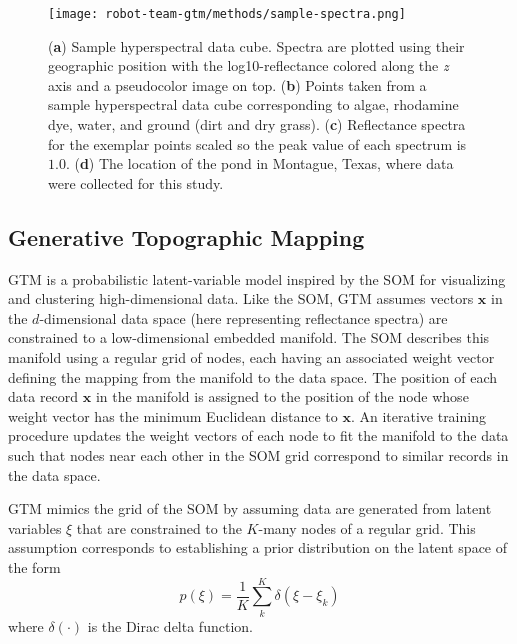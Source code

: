 \begin{figure}[H]
  \centering
  \texttt{[image: robot-team-gtm/methods/sample-spectra.png]}
  \caption{(\textbf{a}) Sample hyperspectral data cube. Spectra are plotted
    using their geographic position with the log10-reflectance colored along the
    \emph{z} axis and a pseudocolor image on top. (\textbf{b}) Points taken from
    a sample hyperspectral data cube corresponding to algae, rhodamine dye,
    water, and ground (dirt and dry grass). (\textbf{c}) Reflectance spectra for
    the exemplar points scaled so the peak value of each spectrum is $1.0$.
    (\textbf{d}) The location of the pond in Montague, Texas, where data were
    collected for this study.}
    \label{fig:sample-spectra}
\end{figure}

\subsection{Generative Topographic Mapping}\label{sec:gtm-overview}

GTM is a probabilistic latent-variable model inspired by the  SOM for visualizing and clustering high-dimensional data. Like the  SOM, GTM assumes vectors $\mathbf{x}$ in the $d$-dimensional data space (here representing reflectance spectra) are constrained to a low-dimensional embedded manifold. The SOM describes this manifold using a regular grid of nodes, each having an associated weight vector defining the mapping from the manifold to the data space. The position of each data record $\mathbf{x}$ in the manifold is assigned to the position of the node whose weight vector has the minimum Euclidean distance to $\mathbf{x}$. An iterative training procedure updates the weight vectors of each node to fit the manifold to the data such that nodes near each other in the SOM grid correspond to similar records in the data space.

GTM mimics the grid of the SOM by assuming data are generated from latent variables $\xi$ that are constrained to the $K$-many nodes of a regular grid. This assumption corresponds to establishing a prior distribution on the latent space of the form
\begin{equation}\label{eq:latent-prob}
    p(\xi) = \frac{1}{K}\sum_k^K \delta(\xi - \xi_k)
\end{equation}
where $\delta(\cdot)$ is the Dirac delta function.

